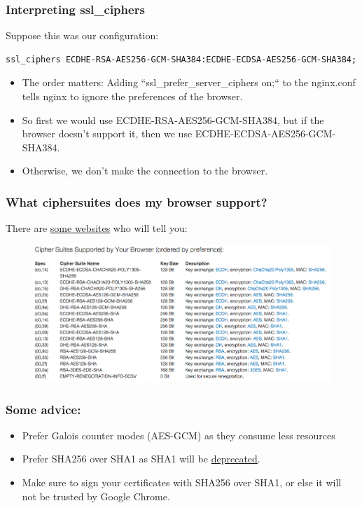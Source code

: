 \documentclass[9pt]{beamer}
\begin{document}
\begin{frame}[fragile]
\frametitle{Interpreting ssl\_ciphers}
Suppose this was our configuration:
\begin{verbatim}
ssl_ciphers ECDHE-RSA-AES256-GCM-SHA384:ECDHE-ECDSA-AES256-GCM-SHA384;
\end{verbatim}
\begin{itemize}
\item The order matters: Adding ``ssl\_prefer\_server\_ciphers on;`` to the nginx.conf tells nginx to ignore the preferences of the browser.
\pause
\item So first we would use ECDHE-RSA-AES256-GCM-SHA384, but if the browser doesn't support it, then we use ECDHE-ECDSA-AES256-GCM-SHA384.
\pause
\item Otherwise, we don't make the connection to the browser.
\end{itemize}
\end{frame}


\begin{frame}[fragile]
\frametitle{What ciphersuites does my browser support?}
There are \href{https://cc.dcsec.uni-hannover.de/}{some websites} who will tell you:
\begin{figure}
\includegraphics[scale=0.25]{figures/browserciphersuites.png}
\end{figure}
\end{frame}

\begin{frame}[fragile]
\frametitle{Some advice:}
\begin{itemize}
\item Prefer Galois counter modes (AES-GCM) as they consume less resources
\pause
\item Prefer SHA256 over SHA1 as SHA1 will be \href{http://googleonlinesecurity.blogspot.com/2014/09/gradually-sunsetting-sha-1.html}{deprecated}.
\pause
\item Make sure to sign your certificates with SHA256 over SHA1, or else it will not be trusted by Google Chrome.
\end{itemize}
\end{frame}
\end{document}
